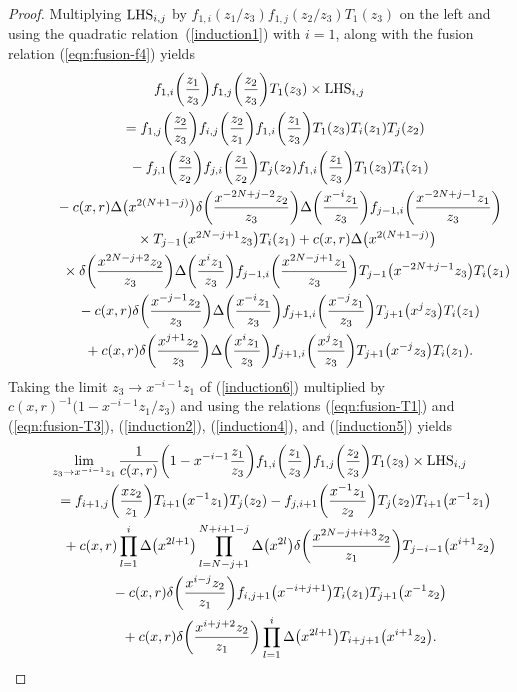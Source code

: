 \documentclass[10pt,a4paper]{amsart}
\numberwithin{equation}{section}
\begin{document}
\begin{proof}
Multiplying ${\rm LHS}_{i,j}$ by
$f_{1,i}(z_1/z_3)f_{1,j}(z_2/z_3)T_1(z_3)$
on the left and using the quadratic rela\-tion~(\ref{induction1}) with $i=1$,
along with the fusion relation (\ref{eqn:fusion-f4}) yields
\begin{gather}
f_{1,i}\bigg(\frac{z_1}{z_3}\bigg)
f_{1,j}\bigg(\frac{z_2}{z_3}\bigg)T_1(z_3)
\times {\rm LHS}_{i, j}\notag
\\ \qquad
{}=f_{1,j}\bigg(\frac{z_2}{z_3}\bigg)
f_{i,j}\bigg(\frac{z_2}{z_1}\bigg)
f_{1,i}\bigg(\frac{z_1}{z_3}\bigg)T_1(z_3)T_i(z_1)T_j(z_2)\notag
\\ \qquad\hphantom{=}
{}-f_{j,1}\bigg(\frac{z_3}{z_2}\bigg)
f_{j,i}\bigg(\frac{z_1}{z_2}\bigg)T_j(z_2)
f_{1,i}\bigg(\frac{z_1}{z_3}\bigg)T_1(z_3)T_i(z_1)\notag
\\ \qquad\hphantom{=}
{}-c(x,r)\Delta\big(x^{2(N+1-j)}\big)
\delta\bigg(\frac{x^{-2N+j-2}z_2}{z_3}\bigg)
\Delta\bigg(\frac{x^{-i}z_1}{z_3}\bigg)
f_{j-1,i}\bigg(\frac{x^{-2N+j-1}z_1}{z_3}\bigg)\notag
\\ \qquad\hphantom{=-}
{}\times T_{j-1}\big(x^{2N-j+1}z_3\big)T_i(z_1)
+c(x,r)\Delta\big(x^{2(N+1-j)}\big)\notag
\\ \qquad\hphantom{=-}
{}\times\delta\bigg(\frac{x^{2N-j+2}z_2}{z_3}\bigg)
\Delta\bigg(\frac{x^{i}z_1}{z_3}\bigg)
f_{j-1,i}\bigg(\frac{x^{2N-j+1}z_1}{z_3}\bigg)
T_{j-1}\big(x^{-2N+j-1}z_3\big)T_i(z_1)\notag
\\ \qquad\hphantom{=}
{}-c(x,r)\delta\bigg(\frac{x^{-j-1}z_2}{z_3}\bigg)
\Delta\bigg(\frac{x^{-i}z_1}{z_3}\bigg)f_{j+1,i} \bigg(\frac{x^{-j}z_1}{z_3}\bigg)T_{j+1}\big(x^jz_3\big)T_i(z_1)\notag
\\ \qquad\hphantom{=}
{}+c(x,r)\delta\bigg(\frac{x^{j+1}z_2}{z_3}\bigg)
\Delta\bigg(\frac{x^{i}z_1}{z_3}\bigg)
f_{j+1,i}\bigg(\frac{x^{j}z_1}{z_3}\bigg)T_{j+1}\big(x^{-j}z_3\big)T_i(z_1).
\label{induction6}
\end{gather}
Taking the limit $z_3\to x^{-i-1}z_1$ of (\ref{induction6}) multiplied by
$c(x,r)^{-1} \big(1-x^{-i-1}z_1/z_3\big)$ and using the relations
(\ref{eqn:fusion-T1}) and (\ref{eqn:fusion-T3}),
(\ref{induction2}), (\ref{induction4}), and (\ref{induction5}) yields
\begin{gather}
\lim_{z_3 \to x^{-i-1}z_1}\frac{1}{c(x,r)}\bigg(1-x^{-i-1}\frac{z_1}{z_3}\bigg)
f_{1,i}\bigg(\frac{z_1}{z_3}\bigg)f_{1,j}\bigg(\frac{z_2}{z_3}\bigg)T_1(z_3)
\times {\rm LHS}_{i, j}\notag
\\ \qquad
{}=f_{i+1,j}\bigg(\frac{xz_2}{z_1}\bigg)T_{i+1}\big(x^{-1}z_1\big)T_j(z_2)-
f_{j,i+1}\bigg(\frac{x^{-1}z_1}{z_2}\bigg)T_j(z_2)T_{i+1}\big(x^{-1}z_1\big)\notag
\\ \qquad\hphantom{=}
{}+c(x,r) \prod_{l=1}^i \Delta\big(x^{2l+1}\big)\prod_{l=N-j+1}^{N+i+1-j}
\Delta\big(x^{2l}\big)\delta\bigg(\frac{x^{2N-j+i+3}z_2}{z_1}\bigg)T_{j-i-1}\big(x^{i+1}z_2\big)\notag
\\ \qquad\hphantom{=}
{}-c(x,r)\delta\bigg(\frac{x^{i-j}z_2}{z_1}\bigg)
f_{i,j+1}\big(x^{-i+j+1}\big)T_i(z_1)T_{j+1}\big(x^{-1}z_2\big)\notag
\\ \qquad\hphantom{=}
{}+c(x,r)\delta\bigg(\frac{x^{i+j+2}z_2}{z_1}\bigg)\prod_{l=1}^{i}
\Delta\big(x^{2l+1}\big)T_{i+j+1}\big(x^{i+1}z_2\big).
\label{induction7}
\end{gather}


\end{proof}
\end{document}
